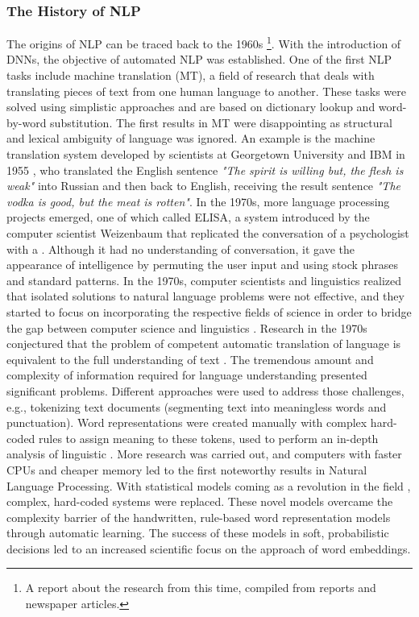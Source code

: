 \subsubsection{The History of NLP}
    \label{sec:the_history_of_NLP}
The origins of NLP can be traced back to the 1960s \cite{dostert1955georgetown, Hutchins2006TheFP}\footnote{A report about the research from this time, compiled from reports and newspaper articles.}. With the introduction of DNNs, the objective of automated NLP was established. One of the first NLP tasks include machine translation (MT), a field of research that deals with translating pieces of text from one human language to another. These tasks were solved using simplistic approaches and are based on dictionary lookup and word-by-word substitution. 
The first results in MT were disappointing as structural and lexical ambiguity of language was ignored. An example is the machine translation system developed by scientists at Georgetown University and IBM in 1955 \cite{dostert1955georgetown}, who translated the English sentence \textit{"The spirit is willing but, the flesh is weak"} into Russian and then back to English, receiving the result sentence \textit{"The vodka is good, but the meat is rotten"}.
 In the 1970s, more language processing projects emerged, one of which called ELISA, a system introduced by the computer scientist Weizenbaum that replicated the conversation of a psychologist with a  \cite{weizenbaum1966eliza}. Although it had no understanding of conversation, it gave the appearance of intelligence by permuting the user input and using stock phrases and standard patterns. In the 1970s, computer scientists and linguistics realized that isolated solutions to natural language problems were not effective, and they started to focus on incorporating the respective fields of science in order to bridge the gap between computer science and linguistics \cite{kumar2011natural}. 
 Research in the 1970s conjectured that the problem of competent automatic translation of language is equivalent to the full understanding of text \cite{carbonell1981steps}. The tremendous amount and complexity of information required for language understanding presented significant problems.  Different approaches were used to address those challenges, e.g., tokenizing text documents (segmenting text into meaningless words and punctuation). Word representations were created manually with complex hard-coded rules to assign meaning to these tokens, used to perform an in-depth analysis of linguistic \cite{catania1972chomsky}. 
 More research was carried out, and computers with faster CPUs and cheaper memory led to the first noteworthy results in Natural Language Processing.  With statistical models coming as a revolution in the field \cite{bahl1989tree}, complex, hard-coded systems were replaced. 
 These novel models overcame the complexity barrier of the handwritten, rule-based word representation models through automatic learning. The success of these models in soft, probabilistic decisions led to an increased scientific focus on the approach of word embeddings.
 
